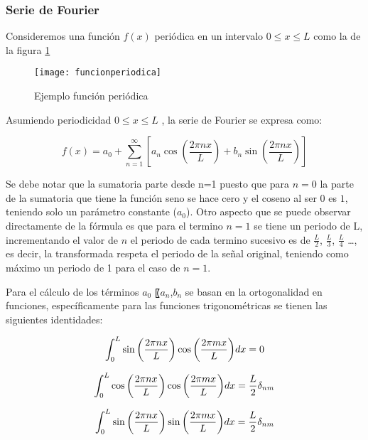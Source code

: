 		\subsubsection{Serie de Fourier}
			Consideremos una función $f(x)$ periódica en un intervalo $0 \leq x\leq L$ como la de la figura \ref{fig:funcperiodica}
			\begin{figure}[H]
				\centering
				\texttt{[image: funcionperiodica]}
				\caption{Ejemplo función periódica}
				\label{fig:funcperiodica}
			\end{figure}	
			\newpage
		
			Asumiendo periodicidad $0\leq x \leq L$ , la serie de Fourier se expresa como:
			
			\begin{equation}			
			f\left(x\right)=a_0+\sum_{n=1}^{\infty{}}\left[a_n\cos{\left(\frac{2\pi{}nx}{L}\right)}+b_n\sin{\left(\frac{2\pi{}nx}{L}\right)}\right]
			\label{eq:seriedefourier}
			\end{equation}
			
			Se debe notar que la sumatoria parte desde n=1 puesto que para $n=0$ la parte de la sumatoria que tiene la función seno se hace cero y el coseno al ser $0$ es $1$, teniendo solo un parámetro constante ($a_0$). Otro aspecto que se puede observar directamente de la fórmula es que para el termino $n=1$ se tiene un periodo de L, incrementando el valor de $n$ el periodo de cada termino sucesivo es de $\frac{L}{2}$, $\frac{L}{3}$, $\frac{L}{4}$ …, es decir, la transformada respeta el periodo de la señal original, teniendo como máximo un periodo de 1 para el caso de $n=1$.
			
			Para el cálculo de los términos $a_0$ 〖$a_n$,$b_n$ se basan en la ortogonalidad en funciones, específicamente para las funciones trigonométricas se tienen las siguientes identidades:
			
			\begin{equation}			
				\centering				
				\int_0^L\sin{\left(\frac{2\pi{}nx}{L}\right)\cos{\left(\frac{2\pi{}mx}{L}\right)}}dx=0				
				\label{eq:proptrig1}
			\end{equation}		
				
			\begin{equation}
				\centering
				\int_0^L\cos{\left(\frac{2\pi{}nx}{L}\right)\cos{\left(\frac{2\pi{}mx}{L}\right)}}dx=\frac{L}{2}\delta_{nm}
				\label{eq:proptrig2}
			\end{equation}
			
			\begin{equation}
				\centering
				\int_0^L\sin{\left(\frac{2\pi{}nx}{L}\right)\sin{\left(\frac{2\pi{}mx}{L}\right)}}dx=\frac{L}{2}\delta_{nm}
				\label{eq:proptrig3}
			\end{equation}
			
